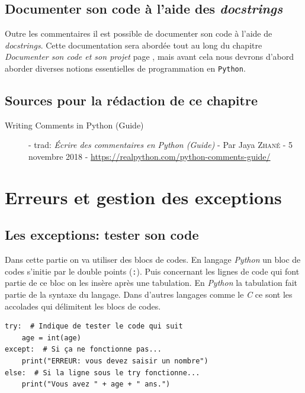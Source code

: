 \documentclass[a4paper,12pt]{book}
\begin{document}
\section{Documenter son code à l'aide des \textit{docstrings}}\label{documenteravecdocstring}
Outre les commentaires il est possible de documenter son code à l'aide de \textit{docstrings}. Cette documentation sera abordée tout au long du chapitre \textit{Documenter son code et son projet} page \pageref{documentercodeprojet}, mais avant cela nous devrons d'abord aborder diverses notions essentielles de programmation en \texttt{Python}.
\medskip
 
 \section*{Sources pour la rédaction de ce chapitre}
\begin{description}
	\item[Writing Comments in Python (Guide)] - trad: \og \textit{Écrire des commentaires en Python (Guide)} \fg{} - Par Jaya \textsc{Zhané} - 5 novembre 2018 - \url{https://realpython.com/python-comments-guide/}
\end{description}
\medskip

\chapter{Erreurs et gestion des exceptions}
\section{Les exceptions: tester son code}
Dans cette partie on va utiliser des blocs de codes. En langage \textit{Python} un bloc de codes s'initie par le double points (\texttt{:}). Puis concernant les lignes de code qui font partie de ce bloc on les insère après une tabulation. En \textit{Python} la tabulation fait partie de la syntaxe du langage. Dans d'autres langages comme le \textit{C} ce sont les accolades qui délimitent les blocs de codes.
\medskip

\begin{lstlisting}
try:  # Indique de tester le code qui suit
    age = int(age)
except:  # Si ça ne fonctionne pas...
    print("ERREUR: vous devez saisir un nombre")
else:  # Si la ligne sous le try fonctionne...
    print("Vous avez " + age + " ans.")
\end{lstlisting}
\medskip
\end{document}
